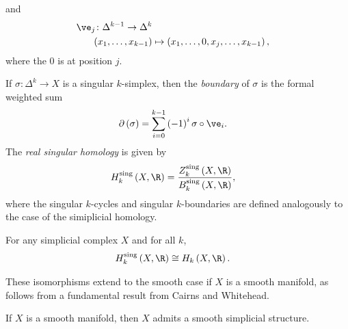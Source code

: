 \documentclass[10pt]{mypackage}
\begin{document}
and
\begin{align*}
  \ve_j\colon\Delta^{k-1}\rightarrow \Delta^{k}\\
  \left( x_1,\dots,x_{k-1} \right) &\mapsto \left( x_1,\dots,0,x_j,\dots,x_{k-1} \right),
\end{align*}
where the $0$ is at position $j$.
\begin{definition}
  If $\sigma\colon \Delta^{k}\rightarrow X$ is a singular $k$-simplex, then the \textit{boundary} of $\sigma$ is the formal weighted sum
  \begin{align*}
    \partial\left( \sigma \right) &= \sum_{i=0}^{k-1} \left( -1 \right)^{i} \sigma\circ\ve_i.
  \end{align*}
  The \textit{real singular homology} is given by
  \begin{align*}
    H_k^{\operatorname{sing}} \left( X,\R \right) &= \frac{Z_k^{\operatorname{sing}}\left( X,\R \right)}{B_k^{\operatorname{sing}}\left( X,\R \right)},
  \end{align*}
  where the singular $k$-cycles and singular $k$-boundaries are defined analogously to the case of the simiplicial homology.
\end{definition}
\begin{theorem}
  For any simplicial complex $X$ and for all $k$,
  \begin{align*}
    H_k^{\operatorname{sing}}\left( X,\R \right) &\cong H_k\left( X,\R \right).
  \end{align*}
\end{theorem}
These isomorphisms extend to the smooth case if $X$ is a smooth manifold, as follows from a fundamental result from Cairns and Whitehead.
\begin{theorem}
  If $X$ is a smooth manifold, then $X$ admits a smooth simplicial structure.
\end{theorem}
\end{document}
